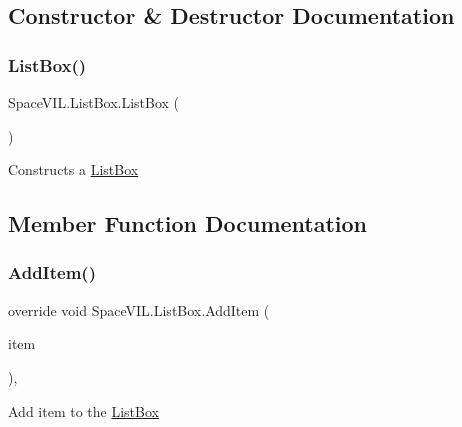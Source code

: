 \subsection{Constructor \& Destructor Documentation}
\mbox{\label{class_space_v_i_l_1_1_list_box_a8978541c968c377b489f94685336a2da}} 
\subsubsection{\texorpdfstring{List\+Box()}{ListBox()}}
{\footnotesize\ttfamily Space\+V\+I\+L.\+List\+Box.\+List\+Box (\begin{DoxyParamCaption}{ }\end{DoxyParamCaption})\hspace{0.3cm}{\ttfamily [inline]}}



Constructs a \mbox{\hyperlink{class_space_v_i_l_1_1_list_box}{List\+Box}} 



\subsection{Member Function Documentation}
\mbox{\label{class_space_v_i_l_1_1_list_box_a3650d9e40035bd0d22c30b475a0a90f0}} 
\subsubsection{\texorpdfstring{Add\+Item()}{AddItem()}}
{\footnotesize\ttfamily override void Space\+V\+I\+L.\+List\+Box.\+Add\+Item (\begin{DoxyParamCaption}\item[{\mbox{\hyperlink{interface_space_v_i_l_1_1_core_1_1_i_base_item}{I\+Base\+Item}}}]{item }\end{DoxyParamCaption})\hspace{0.3cm}{\ttfamily [inline]}, {\ttfamily [virtual]}}



Add item to the \mbox{\hyperlink{class_space_v_i_l_1_1_list_box}{List\+Box}} 



